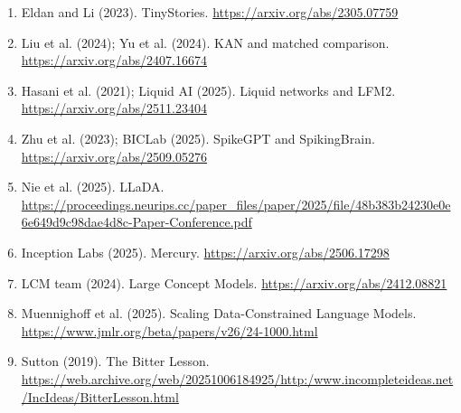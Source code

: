 \begin{enumerate}[leftmargin=*,itemsep=2pt]
\item Eldan and Li (2023). TinyStories. \url{https://arxiv.org/abs/2305.07759}
\item Liu et al. (2024); Yu et al. (2024). KAN and matched comparison. \url{https://arxiv.org/abs/2407.16674}
\item Hasani et al. (2021); Liquid AI (2025). Liquid networks and LFM2. \url{https://arxiv.org/abs/2511.23404}
\item Zhu et al. (2023); BICLab (2025). SpikeGPT and SpikingBrain. \url{https://arxiv.org/abs/2509.05276}
\item Nie et al. (2025). LLaDA. \url{https://proceedings.neurips.cc/paper_files/paper/2025/file/48b383b24230e0e6e649d9c98dae4d8c-Paper-Conference.pdf}
\item Inception Labs (2025). Mercury. \url{https://arxiv.org/abs/2506.17298}
\item LCM team (2024). Large Concept Models. \url{https://arxiv.org/abs/2412.08821}
\item Muennighoff et al. (2025). Scaling Data-Constrained Language Models. \url{https://www.jmlr.org/beta/papers/v26/24-1000.html}
\item Sutton (2019). The Bitter Lesson. \url{https://web.archive.org/web/20251006184925/http:/www.incompleteideas.net/IncIdeas/BitterLesson.html}
\end{enumerate}


